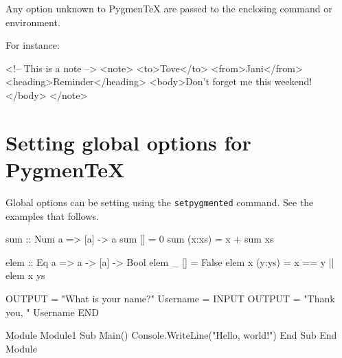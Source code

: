 \documentclass[10pt,a4paper]{article}
\begin{document}
Any option unknown to Pygmen\TeX{} are passed to the enclosing command
or environment.

For instance:

\begin{Example}
\begin{pygmented}[lang=xml,boxing method=tcolorbox,colframe=red,boxrule=2mm]
<!-- This is a note -->
<note>
   <to>Tove</to>
   <from>Jani</from>
   <heading>Reminder</heading>
   <body>Don't forget me this weekend!</body>
</note>
\end{pygmented}
\end{Example}

\section{Setting global options for Pygmen\TeX{}}

Global options can be setting using the \verb|setpygmented| command.
See the examples that follows.

\begin{Example}

\begin{pygmented}[]
sum :: Num a => [a] -> a
sum [] = 0
sum (x:xs) = x + sum xs
\end{pygmented}
\end{Example}

\begin{Example}
\begin{pygmented}[colback=blue!20, boxing method=tcolorbox]
elem :: Eq a => a -> [a] -> Bool
elem _ [] = False
elem x (y:ys) = x == y || elem x ys
\end{pygmented}
\end{Example}

\begin{Example}

\begin{pygmented}[]
          OUTPUT = "What is your name?"
          Username = INPUT
          OUTPUT = "Thank you, " Username
END
\end{pygmented}
\end{Example}

\begin{Example}

\begin{pygmented}[test, lang=vbnet]
Module Module1
    Sub Main()
        Console.WriteLine("Hello, world!")
    End Sub
End Module
\end{pygmented}
\end{Example}
\end{document}
